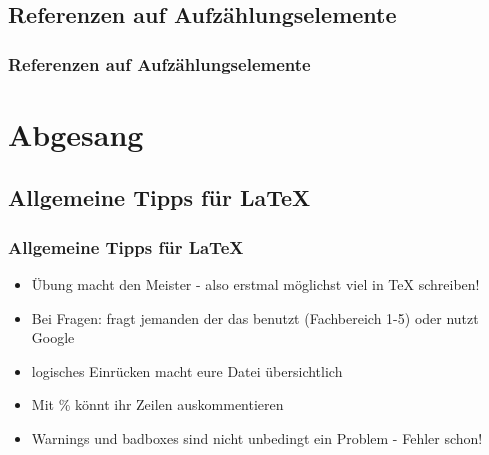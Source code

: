\documentclass{beamer}
\begin{document}
\subsection{Referenzen auf Aufzählungselemente}
\begin{frame}[fragile]
\frametitle{Referenzen auf Aufzählungselemente}
  \begin{semiverbatim}
  \end{semiverbatim}
\end{frame}


\section{Abgesang}
\subsection{Allgemeine Tipps für LaTeX}
\begin{frame}
\frametitle{Allgemeine Tipps für \LaTeX}
  \begin{itemize}
    \item<1-> Übung macht den Meister - also erstmal möglichst viel in TeX schreiben!
    \item<2-> Bei Fragen: fragt jemanden der das benutzt (Fachbereich 1-5) oder nutzt Google
    \item<3-> logisches Einrücken macht eure Datei übersichtlich
    \item<4-> Mit \% könnt ihr Zeilen auskommentieren
    \item<5-> Warnings und badboxes sind nicht unbedingt ein Problem - Fehler schon!
  \end{itemize}
\end{frame}
\end{document}
